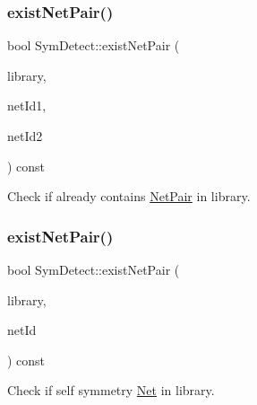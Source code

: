 \subsubsection{\texorpdfstring{exist\+Net\+Pair()}{existNetPair()}\hspace{0.1cm}{\footnotesize\ttfamily [1/2]}}
{\footnotesize\ttfamily bool Sym\+Detect\+::exist\+Net\+Pair (\begin{DoxyParamCaption}\item[{std\+::vector$<$ \hyperlink{classNetPair}{Net\+Pair} $>$ \&}]{library,  }\item[{\hyperlink{type_8h_a581e8093e28e7362f2b6937296190676}{Index\+Type}}]{net\+Id1,  }\item[{\hyperlink{type_8h_a581e8093e28e7362f2b6937296190676}{Index\+Type}}]{net\+Id2 }\end{DoxyParamCaption}) const\hspace{0.3cm}{\ttfamily [private]}}



Check if already contains \hyperlink{classNetPair}{Net\+Pair} in library. 

\mbox{\label{classSymDetect_a04b449b545fe7d175e4733b3f602c41c}} 
\subsubsection{\texorpdfstring{exist\+Net\+Pair()}{existNetPair()}\hspace{0.1cm}{\footnotesize\ttfamily [2/2]}}
{\footnotesize\ttfamily bool Sym\+Detect\+::exist\+Net\+Pair (\begin{DoxyParamCaption}\item[{std\+::vector$<$ \hyperlink{classNetPair}{Net\+Pair} $>$ \&}]{library,  }\item[{\hyperlink{type_8h_a581e8093e28e7362f2b6937296190676}{Index\+Type}}]{net\+Id }\end{DoxyParamCaption}) const\hspace{0.3cm}{\ttfamily [private]}}



Check if self symmetry \hyperlink{classNet}{Net} in library. 

\mbox{\label{classSymDetect_a58ba284bb8522714804a192b2720cae3}} 
